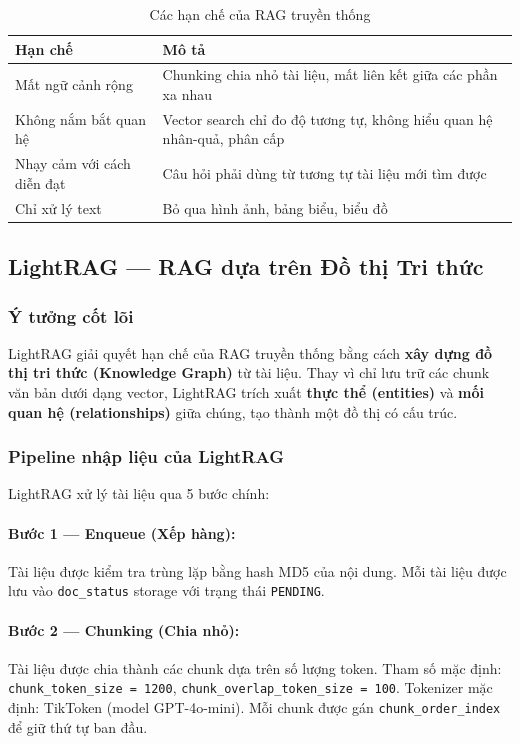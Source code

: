 \documentclass[12pt,a4paper]{article}
\begin{document}
\begin{table}[H]
\centering
\caption{Các hạn chế của RAG truyền thống}
\begin{tabular}{p{4cm}p{9cm}}
\toprule
\textbf{Hạn chế} & \textbf{Mô tả} \\
\midrule
Mất ngữ cảnh rộng & Chunking chia nhỏ tài liệu, mất liên kết giữa các phần xa nhau \\
Không nắm bắt quan hệ & Vector search chỉ đo độ tương tự, không hiểu quan hệ nhân-quả, phân cấp \\
Nhạy cảm với cách diễn đạt & Câu hỏi phải dùng từ tương tự tài liệu mới tìm được \\
Chỉ xử lý text & Bỏ qua hình ảnh, bảng biểu, biểu đồ \\
\bottomrule
\end{tabular}
\end{table}

\subsection{LightRAG --- RAG dựa trên Đồ thị Tri thức}

\subsubsection{Ý tưởng cốt lõi}

LightRAG giải quyết hạn chế của RAG truyền thống bằng cách \textbf{xây dựng đồ thị tri thức (Knowledge Graph)} từ tài liệu. Thay vì chỉ lưu trữ các chunk văn bản dưới dạng vector, LightRAG trích xuất \textbf{thực thể (entities)} và \textbf{mối quan hệ (relationships)} giữa chúng, tạo thành một đồ thị có cấu trúc.

\subsubsection{Pipeline nhập liệu của LightRAG}

LightRAG xử lý tài liệu qua 5 bước chính:

\paragraph{Bước 1 --- Enqueue (Xếp hàng):}
Tài liệu được kiểm tra trùng lặp bằng hash MD5 của nội dung. Mỗi tài liệu được lưu vào \texttt{doc\_status} storage với trạng thái \texttt{PENDING}.

\paragraph{Bước 2 --- Chunking (Chia nhỏ):}
Tài liệu được chia thành các chunk dựa trên số lượng token. Tham số mặc định: \texttt{chunk\_token\_size = 1200}, \texttt{chunk\_overlap\_token\_size = 100}. Tokenizer mặc định: TikToken (model GPT-4o-mini). Mỗi chunk được gán \texttt{chunk\_order\_index} để giữ thứ tự ban đầu.
\end{document}
